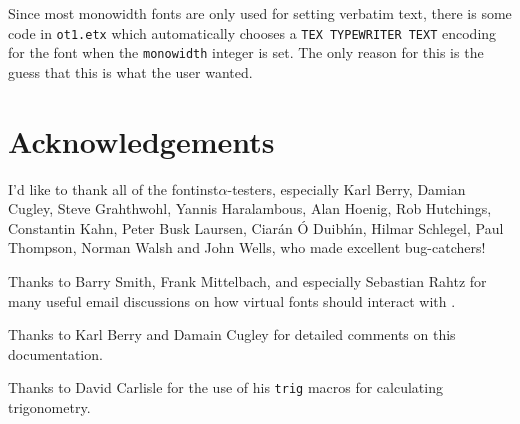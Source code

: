 \documentclass[a4paper]{ltxguide}
\newcommand*{\setpackagename}[1]{\textsf{#1}}
\newcommand{\fontinst}{\setpackagename{font\-inst}\xspace}
\begin{document}
Since most monowidth fonts are only used for setting verbatim text, 
there is some code in \texttt{ot1.etx} which automatically chooses a 
\texttt{TEX TYPEWRITER TEXT} encoding for the font when the 
\texttt{monowidth} integer is set. The only reason for this is the 
guess that this is what the user wanted.



\section*{Acknowledgements}

I'd like to thank all of the \fontinst $\alpha$-testers, especially
Karl Berry, Damian Cugley, Steve Grahthwohl, Yannis Haralambous, Alan
Hoenig, Rob Hutchings, Constantin Kahn, Peter Busk Laursen, Ciar{\'a}n {\'O}
Duibh{\'\i}n, Hilmar Schlegel, Paul Thompson, Norman Walsh and John Wells,
who made excellent bug-catchers!

Thanks to Barry Smith, Frank Mittelbach, and especially Sebastian
Rahtz for many useful email discussions on how virtual fonts should
interact with \LaTeXe.

Thanks to Karl Berry and Damain Cugley for detailed comments on this
documentation.

Thanks to David Carlisle for the use of his \texttt{trig} macros for
calculating trigonometry.


% 
% 
% 
% 
\end{document}
